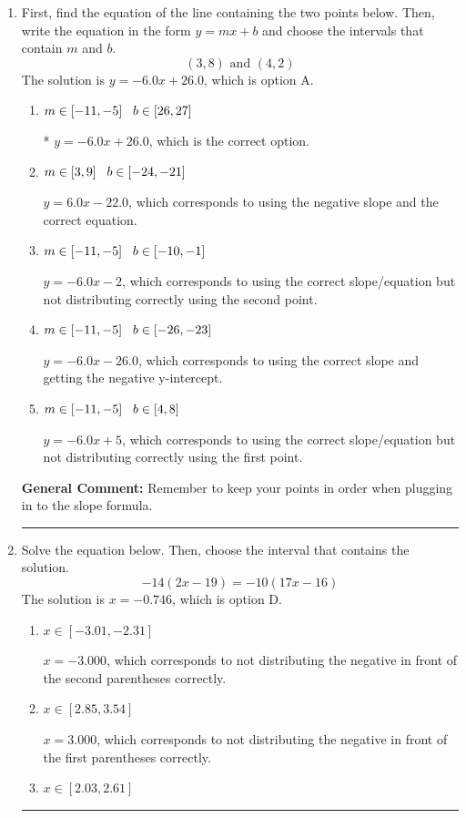 \documentclass{extbook}[14pt]
\newcommand{\litem}[1]{\item #1

\rule{\textwidth}{0.4pt}}
\begin{document}
\begin{enumerate}\litem{
First, find the equation of the line containing the two points below. Then, write the equation in the form $ y=mx+b $ and choose the intervals that contain $m$ and $b$.
\[ (3, 8) \text{ and } (4, 2) \]The solution is \( y = -6.0x + 26.0 \), which is option A.\begin{enumerate}[label=\Alph*.]
\item \( m \in [-11, -5] \hspace*{3mm} b \in [26, 27] \)

* $y = -6.0x + 26.0$, which is the correct option.
\item \( m \in [3, 9] \hspace*{3mm} b \in [-24, -21] \)

 $y = 6.0x -22.0$, which corresponds to using the negative slope and the correct equation.
\item \( m \in [-11, -5] \hspace*{3mm} b \in [-10, -1] \)

 $y = -6.0x -2$, which corresponds to using the correct slope/equation but not distributing correctly using the second point.
\item \( m \in [-11, -5] \hspace*{3mm} b \in [-26, -23] \)

 $y = -6.0x -26.0$, which corresponds to using the correct slope and getting the negative y-intercept.
\item \( m \in [-11, -5] \hspace*{3mm} b \in [4, 8] \)

 $y = -6.0x + 5$, which corresponds to using the correct slope/equation but not distributing correctly using the first point.
\end{enumerate}

\textbf{General Comment:} Remember to keep your points in order when plugging in to the slope formula.
}
\litem{
Solve the equation below. Then, choose the interval that contains the solution.
\[ -14(2x -19) = -10(17x -16) \]The solution is \( x = -0.746 \), which is option D.\begin{enumerate}[label=\Alph*.]
\item \( x \in [-3.01, -2.31] \)

$x = -3.000$, which corresponds to not distributing the negative in front of the second parentheses correctly.
\item \( x \in [2.85, 3.54] \)

$x = 3.000$, which corresponds to not distributing the negative in front of the first parentheses correctly.
\item \( x \in [2.03, 2.61] \)


\end{enumerate}}
\end{enumerate}
\end{document}
